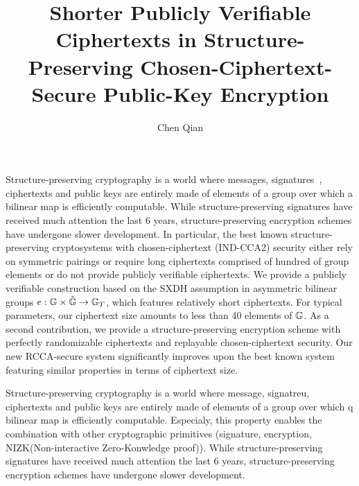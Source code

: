 \documentclass[10pt]{article}
\begin{document}
\pagestyle{plain}


\title{Shorter Publicly Verifiable Ciphertexts in Structure-Preserving Chosen-Ciphertext-Secure Public-Key Encryption}

\author{Chen Qian}


\maketitle


Structure-preserving cryptography is a world where messages, signatures~\cite{DBLP:conf/crypto/AbeFGHO10}, ciphertexts and public keys are entirely made of 
elements of a group over which a bilinear map is efficiently computable. While structure-preserving signatures have received 
much attention   the last $6$ years, structure-preserving encryption schemes have undergone slower development. 
In particular, the best known  structure-preserving cryptosystems with chosen-ciphertext (IND-CCA2) security either rely on 
symmetric pairings or require 
long ciphertexts comprised of hundred of group elements or do not provide publicly verifiable ciphertexts. We provide a publicly verifiable construction based on the SXDH assumption in asymmetric bilinear groups
 $e : \mathbb{G} \times \hat{\mathbb{G}} \rightarrow \mathbb{G}_T$, 
which features relatively short ciphertexts.   For typical parameters, our ciphertext size amounts to less than $40$ elements of $\mathbb{G}$. 
As a second contribution, we provide a structure-preserving encryption scheme with perfectly randomizable ciphertexts and replayable 
chosen-ciphertext security. Our new RCCA-secure system significantly improves upon the best known system featuring similar properties in terms 
of ciphertext size. \smallskip \smallskip

Structure-preserving cryptography is a world where message, signatreu, ciphertexts and public keys are entirely made of elements of a group over which q bilinear map is efficiently computable.
Especialy, this property enables the combination with other cryptographic primitives (\eg signature, encryption, NIZK(Non-interactive Zero-Konwledge proof)).
While structure-preserving signatures have received much attention the last $6$ years, structure-preserving encryption schemes have undergone slower development.



 
\end{document}
